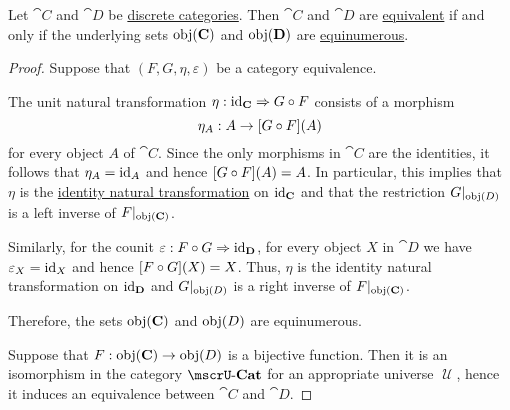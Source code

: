 \begin{proposition}\label{thm:discrete_category_equivalence}
  Let \( \cat{C} \) and \( \cat{D} \) be \hyperref[def:discrete_category]{discrete categories}. Then \( \cat{C} \) and \( \cat{D} \) are \hyperref[def:category_equivalence]{equivalent} if and only if the underlying sets \( \operatorname{obj}(\operatorname{\mathbf{C}}) \) and \( \operatorname{obj}(\operatorname{\mathbf{D}}) \) are \hyperref[def:equinumerosity]{equinumerous}.
\end{proposition}
\begin{proof}
  \SufficiencySubProof Suppose that \( (F, G, \eta, \varepsilon) \) be a category equivalence.

  The unit natural transformation \( \eta: \id_{\cat{C}} \Rightarrow G \bincirc F \) consists of a morphism
  \begin{equation*}
    \eta_A: A \to [G \bincirc F](A)
  \end{equation*}
  for every object \( A \) of \( \cat{C} \). Since the only morphisms in \( \cat{C} \) are the identities, it follows that \( \eta_A = \operatorname{id}_A \) and hence \( [G \bincirc F](A) = A \). In particular, this implies that \( \eta \) is the \hyperref[eq:def:functor_category/identity]{identity natural transformation} on \( \operatorname{id}_{\operatorname{\mathbf{C}}} \) and that the restriction \( G\vert_{\operatorname{obj}(D)} \) is a left inverse of \( F\vert_{\operatorname{obj}(\operatorname{\mathbf{C}})} \).

  Similarly, for the counit \( \varepsilon: F \bincirc G \Rightarrow \id_{\cat{D}} \), for every object \( X \) in \( \cat{D} \) we have \( \varepsilon_X = \operatorname{id}_X \) and hence \( [F \bincirc G](X) = X \). Thus, \( \eta \) is the identity natural transformation on \( \operatorname{id}_{\operatorname{\mathbf{D}}} \) and \( G\vert_{\operatorname{obj}(D)} \) is a right inverse of \( F\vert_{\operatorname{obj}(\operatorname{\mathbf{C}})} \).

  Therefore, the sets \( \operatorname{obj}(\operatorname{\mathbf{C}}) \) and \( \operatorname{obj}(D) \) are equinumerous.

  \NecessitySubProof Suppose that \( F: \operatorname{obj}(\operatorname{\mathbf{C}}) \to \operatorname{obj}(D) \) is a bijective function. Then it is an isomorphism in the category \( \ucat{Cat} \) for an appropriate universe \( \mscrU \), hence it induces an equivalence between \( \cat{C} \) and \( \cat{D} \).
\end{proof}

